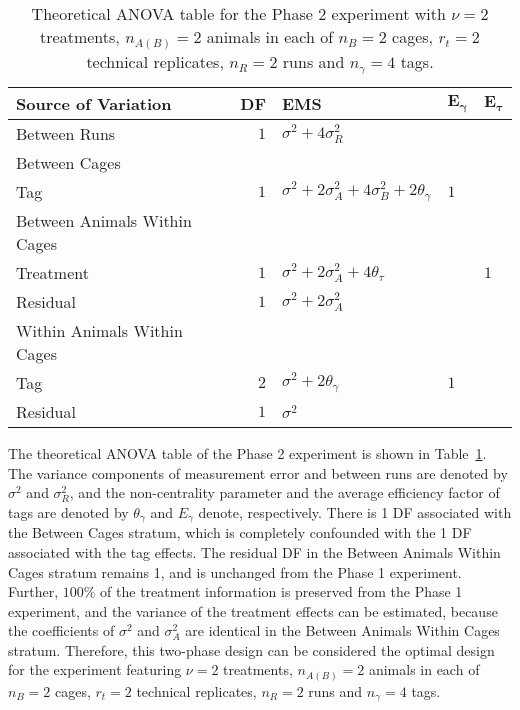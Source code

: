 \begin{table}[ht]
\centering
 \caption{Theoretical ANOVA table for the Phase 2 experiment with $\nu = 2$ treatments, $n_{A(B)} =2$ animals in each of $n_B = 2$ cages, $r_t = 2$ technical replicates, $n_R = 2$ runs and $n_\gamma = 4$ tags.}
 \begin{tabular}[t]{lrlll} 
 \toprule 
 \multicolumn{1}{l}{\textbf{Source of Variation}} & \multicolumn{1}{l}{\textbf{DF}} & \multicolumn{1}{l}{\textbf{EMS}}& \multicolumn{1}{l}{$\bm{E_{\gamma}}$}&\multicolumn{1}{l}{$\bm{E_{\tau}}$}\\ 
 \midrule 
Between Runs & $1$ & $\sigma^2+4\sigma_{R}^2$ & & \\ \hline 
 Between Cages &  &  & & \\ 
 \quad Tag & $1$ & $\sigma^2+2\sigma_{A}^2+4\sigma_{B}^2+2\theta_{\gamma}$ &$1$ & \\ \hline 
 Between Animals Within Cages &  &  & & \\ 
 \quad Treatment & $1$ & $\sigma^2+2\sigma_{A}^2+4\theta_{\tau}$ & & $1$\\ 
 \quad Residual & $1$ & $\sigma^2+2\sigma_{A}^2$ & & \\ \hline 
 Within Animals Within Cages &  &  & & \\ 
 \quad Tag & $2$ & $\sigma^2+2\theta_{\gamma}$ &$1$ & \\ 
 \quad Residual & $1$ & $\sigma^2$ & & \\ 
 \bottomrule 
 \end{tabular} 
 \label{tab:Phase2ANOVAEx} 
\end{table} 

The theoretical ANOVA table of the Phase 2 experiment is shown in Table~\ref{tab:Phase2ANOVAEx}. The variance components of measurement error and between runs are denoted by $\sigma^2$ and $\sigma_{R}^2$, and the non-centrality parameter and the average efficiency factor of tags are denoted by $\theta_{\gamma}$ and $E_{\gamma}$ denote, respectively. There is 1 DF associated with the Between Cages stratum, which is completely confounded with the 1 DF associated with the tag effects. The residual DF in the Between Animals Within Cages stratum remains 1, and is unchanged from the Phase 1 experiment. Further, $100\%$ of the treatment information is preserved from the Phase 1 experiment, and the variance of the treatment effects can be estimated, because the coefficients of $\sigma^2$ and $\sigma_{A}^2$ are identical in the Between Animals Within Cages stratum. Therefore, this two-phase design can be considered the optimal design for the experiment featuring $\nu = 2$ treatments, $n_{A(B)} =2$ animals in each of $n_B = 2$ cages, $r_t = 2$ technical replicates, $n_R = 2$ runs and $n_\gamma = 4$ tags. 


